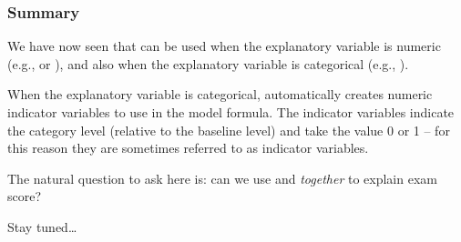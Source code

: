 \documentclass{beamer}\usepackage[]{graphicx}\usepackage[]{xcolor}
\begin{document}
\begin{frame}[fragile]
\frametitle{Summary}

We have now seen that  can be used when the explanatory variable is numeric
(e.g.,  or ), 
and also when the explanatory variable is categorical (e.g., ).

\bigskip

When the explanatory variable is categorical, 
 automatically creates numeric indicator variables to use in the model formula.
The indicator variables indicate the category level (relative to the baseline level) 
and take the value 0 or 1 -- for this reason they are sometimes referred to as indicator variables.

\bigskip
The natural question to ask here is: 
can we use  and  {\em together} to explain exam score?

\bigskip
Stay tuned\ldots
\end{frame}




\end{document}
